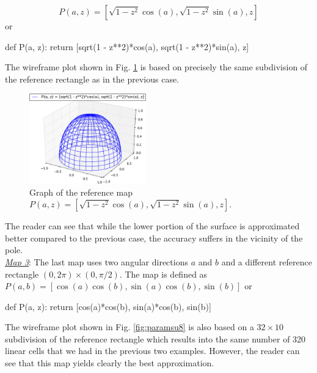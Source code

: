 $$
P(a, z) = \left[\sqrt{1 - z^2}\cos(a), \sqrt{1 - z^2}\sin(a), z\right]
$$
or

\begin{bbox}
def P(a, z): 
    return [sqrt(1 - z**2)*cos(a), sqrt(1 - z**2)*sin(a), z]
\end{bbox}
The wireframe plot shown in Fig. \ref{fig:paramsu3} is based on precisely the 
same subdivision of the reference rectangle as in the previous case. 
\newpage

\begin{figure}[!ht]
\begin{center}
\includegraphics[width=0.45\textwidth]{img/paramsu6.png}
\end{center}
\vspace{-6mm}
\caption{Graph of the reference map $P(a, z) = \left[\sqrt{1 - z^2}\cos(a), \sqrt{1 - z^2}\sin(a), z\right]$.}
\label{fig:paramsu3}
\end{figure}
\noindent
The reader can see that while the lower portion of the surface is approximated 
better compared to the previous case, the accuracy suffers in the vicinity of the pole.\\

\noindent
\underline{\em Map 3}: The last map uses two angular directions $a$ and $b$ and 
a different reference rectangle $(0, 2\pi)\times(0, \pi/2)$. The map is 
defined as
$
P(a, b) = \left[\cos(a)\cos(b), \sin(a)\cos(b), \sin(b)\right]
$
or

\begin{bbox}
def P(a, z): return [cos(a)*cos(b), sin(a)*cos(b), sin(b)]
\end{bbox}
The wireframe plot shown in Fig. \ref{fig:paramsu8} is also based on a
$32 \times 10$ subdivision of the reference rectangle which results into the 
same number of 320 linear cells that we had in the previous two examples.
However, the reader can see that this map yields clearly the best approximation. 

